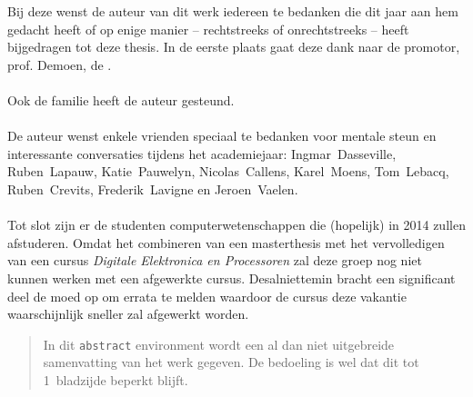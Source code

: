 \documentclass[master=cws,masteroption=ai]{kulemt}
\begin{document}
\begin{preface}
  Bij deze wenst de auteur van dit werk iedereen te bedanken die dit jaar aan hem gedacht heeft of op enige manier -- rechtstreeks of onrechtstreeks -- heeft bijgedragen tot deze thesis. In de eerste plaats gaat deze dank naar de promotor, prof. Demoen, de .
  \paragraph{}
  Ook de familie heeft de auteur gesteund.%
  \paragraph{}
  De auteur wenst enkele vrienden speciaal te bedanken voor mentale steun en interessante conversaties tijdens het academiejaar: \nohyphens{Ingmar~Dasseville}, \nohyphens{Ruben~Lapauw}, \nohyphens{Katie~Pauwelyn}, \nohyphens{Nicolas~Callens}, \nohyphens{Karel~Moens}, \nohyphens{Tom~Lebacq}, \nohyphens{Ruben~Crevits}, \nohyphens{Frederik~Lavigne} en \nohyphens{Jeroen~Vaelen}.
  \paragraph{}
  Tot slot zijn er de studenten computerwetenschappen die (hopelijk) in 2014 zullen afstuderen. Omdat het combineren van een masterthesis met het vervolledigen van een cursus \emph{Digitale Elektronica en Processoren} zal deze groep nog niet kunnen werken met een afgewerkte cursus. Desalniettemin bracht een significant deel de moed op om errata te melden waardoor de cursus deze vakantie waarschijnlijk sneller zal afgewerkt worden.
\end{preface}

\tableofcontents*

\begin{abstract}
  In dit \texttt{abstract} environment wordt een al dan niet uitgebreide
  samenvatting van het werk gegeven. De bedoeling is wel dat dit tot
  1~bladzijde beperkt blijft.

\end{abstract}
\end{document}
